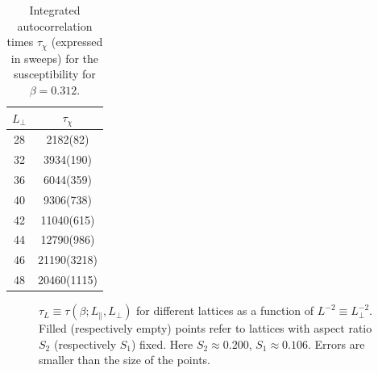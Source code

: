 \documentclass[12pt]{article}
\begin{document}
\begin{table}
\begin{center}
\begin{tabular}{cc}
\hline
$L_\bot$   &  $\tau_\chi$   \\
\hline
28 &     2182(82) \\
32 &     3934(190) \\
36 &     6044(359) \\
40 &     9306(738) \\
42 &     11040(615) \\
44 &     12790(986) \\
46 &     21190(3218) \\
48 &     20460(1115) \\
\hline
\end{tabular}
\end{center}
\caption{Integrated autocorrelation times $\tau_\chi$ (expressed in sweeps) 
for the susceptibility for $\beta = 0.312$. }
\label{Table-tauchi}
\end{table}

 
\begin{figure}[t]
  \centering
\begin{minipage}{\textwidth}
\end{minipage}
\begin{minipage}{\textwidth}
\end{minipage}
\caption{$\tau_L\equiv \tau(\beta;L_\|,L_\bot)$ 
for different  lattices as a function of $L^{-2}\equiv L_\bot^{-2}$.
Filled (respectively empty) points refer to lattices with aspect
ratio $S_{2}$  (respectively $S_{1}$) fixed. Here $S_2 \approx 0.200$,
$S_1 \approx 0.106$. Errors are smaller than the size of the points.
}
\label{fig:tauelle1}
\end{figure}
\end{document}
